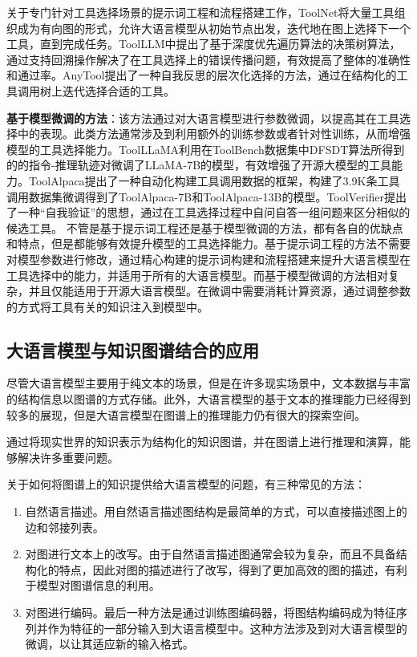 关于专门针对工具选择场景的提示词工程和流程搭建工作，ToolNet\cite{Liu2024}将大量工具组织成为有向图的形式，允许大语言模型从初始节点出发，迭代地在图上选择下一个工具，直到完成任务。ToolLLM\cite{Qin2023}中提出了基于深度优先遍历算法的决策树算法，通过支持回溯操作解决了在工具选择上的错误传播问题，有效提高了整体的准确性和通过率。AnyTool\cite{Du2024}提出了一种自我反思的层次化选择的方法，通过在结构化的工具调用树上迭代选择合适的工具。

\textbf{基于模型微调的方法}：该方法通过对大语言模型进行参数微调，以提高其在工具选择中的表现。此类方法通常涉及到利用额外的训练参数或者针对性训练，从而增强模型的工具选择能力。ToolLLaMA\cite{Qin2023}利用在ToolBench数据集中DFSDT算法所得到的的指令-推理轨迹对微调了LLaMA-7B的模型，有效增强了开源大模型的工具能力。ToolAlpaca\cite{Tang2023}提出了一种自动化构建工具调用数据的框架，构建了3.9K条工具调用数据集微调得到了ToolAlpaca-7B和ToolAlpaca-13B的模型。ToolVerifier\cite{Mekala2024}提出了一种“自我验证”的思想，通过在工具选择过程中自问自答一组问题来区分相似的候选工具。
不管是基于提示词工程还是基于模型微调的方法，都有各自的优缺点和特点，但是都能够有效提升模型的工具选择能力。基于提示词工程的方法不需要对模型参数进行修改，通过精心构建的提示词构建和流程搭建来提升大语言模型在工具选择中的能力，并适用于所有的大语言模型。而基于模型微调的方法相对复杂，并且仅能适用于开源大语言模型。在微调中需要消耗计算资源，通过调整参数的方式将工具有关的知识注入到模型中。

\subsection{大语言模型与知识图谱结合的应用}

尽管大语言模型主要用于纯文本的场景，但是在许多现实场景中，文本数据与丰富的结构信息以图谱的方式存储。此外，大语言模型的基于文本的推理能力已经得到较多的展现，但是大语言模型在图谱上的推理能力仍有很大的探索空间。

通过将现实世界的知识表示为结构化的知识图谱，并在图谱上进行推理和演算，能够解决许多重要问题。

关于如何将图谱上的知识提供给大语言模型的问题，有三种常见的方法：

\begin{enumerate}
    \item 自然语言描述。用自然语言描述图结构是最简单的方式，可以直接描述图上的边和邻接列表。
    \item 对图进行文本上的改写。由于自然语言描述图通常会较为复杂，而且不具备结构化的特点，因此对图的描述进行了改写，得到了更加高效的图的描述，有利于模型对图谱信息的利用。
    \item 对图进行编码。最后一种方法是通过训练图编码器，将图结构编码成为特征序列并作为特征的一部分输入到大语言模型中。这种方法涉及到对大语言模型的微调，以让其适应新的输入格式。
\end{enumerate}

